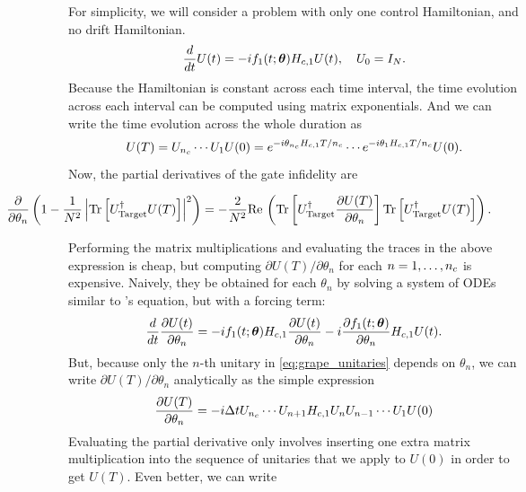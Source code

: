 \documentclass[letterpaper]{tufte-handout}
\begin{document}
For simplicity, we will consider a problem with only one control Hamiltonian, and no drift Hamiltonian.
\[
    \frac{d}{dt}U(t) = -if_1(t;\boldsymbol{\theta})H_{c,1} U(t),\quad U_0 = I_{N}.
\]
Because the Hamiltonian is constant across each time interval, the time evolution across each interval can be computed using matrix exponentials. And we can write the time evolution across the whole duration as
\begin{equation} \label{eq:grape_unitaries}
    U(T) = U_{n_c} \cdots U_1 U(0) = e^{-i\theta_{n_c} H_{c,1} T / {n_c}} \cdots e^{-i\theta_1 H_{c,1} T / {n_c}} U(0).
\end{equation}
Now, the partial derivatives of the gate infidelity are
\begin{fullwidth}
\begin{equation} \label{eq:infidelity_pdv}
    \hspace*{-1in} \pdv{}{\theta_n}\left(1 - \frac{1}{N^2}\left|\tr\left[U_\target^\dagger U(T)\right]\right|^2\right) = -\frac{2}{N^2}\re\left(\tr\left[U_\target^\dagger \pdv{U(T)}{\theta_n}\right] \tr\left[U_\target^\dagger U(T)\right]\right).
\end{equation}
\end{fullwidth}
Performing the matrix multiplications and evaluating the traces in the above expression is cheap, but computing $\partial U(T) / \partial \theta_n$ for each $n=1,\dots,{n_c}$ is expensive. Naively, they be obtained for each $\theta_n$ by solving a system of ODEs similar to \Schrodinger's equation, but with a forcing term:
\[
    \frac{d}{dt}\frac{\partial U(t)}{\partial \theta_n} = -if_1(t;\boldsymbol{\theta})H_{c,1}\frac{\partial U(t)}{\partial \theta_n} -i\frac{\partial f_1(t;\boldsymbol{\theta})}{\partial \theta_n}H_{c,1}U(t).
\]
But, because only the $n$-th unitary in \eqref{eq:grape_unitaries} depends on $\theta_n$, we can write $\partial U(T)/\partial \theta_n$ analytically as the simple expression
\[
\frac{\partial U(T)}{\partial \theta_n} = -i\Delta tU_{n_c} \cdots U_{n+1}H_{c,1}U_n U_{n-1} \cdots U_1 U(0)
\]
Evaluating the partial derivative only involves inserting one extra matrix multiplication into the sequence of unitaries that we apply to $U(0)$ in order to get $U(T)$. Even better, we can write
\end{document}
